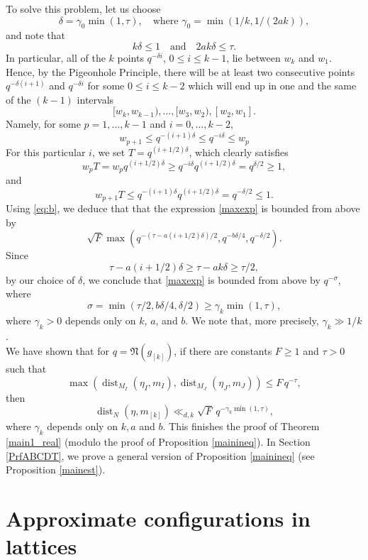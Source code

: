 \documentclass[11pt,reqno,a4paper]{amsart}
\numberwithin{equation}{section}
\newcommand{\qand}{\quad \textrm{and} \quad}
\DeclareMathOperator{\dist}{dist}
\theoremstyle{theorem}
\theoremstyle{definition}
\begin{document}
To solve this problem, let us choose  
$$
\delta = \gamma_0 \min(1,\tau), \quad \textrm{where $\gamma_0 = \min(1/k,1/(2ak))$},
$$
and note that
\[
k \delta \le 1 \qand 2ak \delta 
\le \tau.
\]
In particular, all of the $k$ points $q^{-\delta i}$, $0\le i\le k-1$, lie between $w_k$ and $w_1$. Hence, by the Pigeonhole Principle, there will be at least two consecutive points 
$q^{-\delta (i+1)}$ and $q^{-\delta i}$ for some $0\le i\le k-2$ which will end up in one and the same 
of the $(k-1)$ intervals
\[
[w_k,w_{k-1}), \ldots, [w_3,w_2), [w_2,w_1].
\]
Namely, for some $p=1,\ldots,k-1$ and $i=0,\ldots, k-2$,
\begin{equation}
\label{eq:b}
w_{p+1} \leq q^{-(i+1)\delta} \leq q^{-i \delta} \leq w_p
\end{equation}
For this particular $i$, we set $T = q^{(i+1/2)\delta}$, which clearly satisfies 
\[
w_p T = w_p q^{(i+1/2)\delta}  \geq q^{-i \delta} q^{(i+1/2)\delta}  = q^{\delta/2} \geq 1,
\]
and 
\[
w_{p+1} T \leq q^{-(i+1)\delta} q^{(i+1/2)\delta}  = q^{-\delta/2} \leq 1.
\]
Using \eqref{eq:b}, we deduce that that the expression \eqref{maxexp} is bounded from above by
\[
\sqrt{F} \max(q^{-(\tau - a (i+1/2)\delta)/2}, q^{-b \delta/4},q^{-\delta/2}).
\]
Since 
\[
\tau - a (i+1/2)\delta \geq \tau - a k\delta \geq \tau/2,
\]
by our choice of $\delta$, we conclude that \eqref{maxexp} is bounded from above by $q^{-\sigma}$, where
\[
\sigma = \min(\tau/2,b \delta/4,\delta/2) \geq \gamma_k \min(1,\tau),
\]
where $\gamma_k >0$ depends only  on $k$, $a$, and $b$. 
We note that, more precisely, $\gamma_k \gg 1/k$.\\

We have shown that for $q=\mathfrak{N}(g_{[k]})$, 
if there are constants $F\ge 1$ and $\tau > 0$ such that
\[
\max(\dist_{M_I}(\eta_I,m_I),\dist_{M_J}(\eta_J,m_J)) \leq F\, q^{-\tau},
\]
then 
$$
\dist_{N}(\eta,m_{[k]}) \ll_{d,k} \sqrt{F}\, q^{-\gamma_k \min(1,\tau)},
$$
where $\gamma_k$ depends only on 
$k, a$ and $b$. This finishes the proof of Theorem \ref{main1_real} (modulo the proof of Proposition \ref{mainineq}).
In Section \ref{PrfABCDT}, we prove a general version of Proposition \ref{mainineq}
(see Proposition \ref{mainest}).

\section{Approximate configurations in lattices}
\label{sec:conf}
\end{document}
